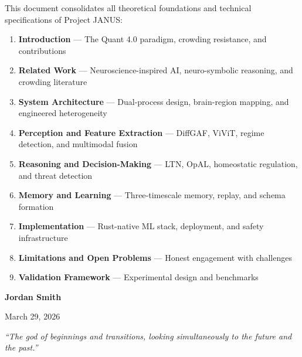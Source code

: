 \documentclass[12pt, a4paper]{article}
\makeatletter
\def\@{}%
\makeatother
\begin{document}
\begin{titlepage}
	\begin{tcolorbox}[colback=janusblue!5, colframe=janusblue, title=\textbf{Unified Documentation}, width=0.85\textwidth]
		\singlespacing\small
		This document consolidates all theoretical foundations and technical specifications of Project JANUS\@:
		\begin{enumerate}[leftmargin=1.5cm, itemsep=1pt, parsep=1pt, topsep=2pt]
			\item \textbf{\textcolor{janusblue}{Introduction}} — The Quant 4.0 paradigm, crowding resistance, and contributions
			\item \textbf{\textcolor{janusblue}{Related Work}} — Neuroscience-inspired AI, neuro-symbolic reasoning, and crowding literature
			\item \textbf{\textcolor{forwardblue}{System Architecture}} — Dual-process design, brain-region mapping, and engineered heterogeneity
			\item \textbf{\textcolor{forwardblue}{Perception and Feature Extraction}} — DiffGAF, ViViT, regime detection, and multimodal fusion
			\item \textbf{\textcolor{backwardpurple}{Reasoning and Decision-Making}} — LTN, OpAL, homeostatic regulation, and threat detection
			\item \textbf{\textcolor{backwardpurple}{Memory and Learning}} — Three-timescale memory, replay, and schema formation
			\item \textbf{\textcolor{rustorange}{Implementation}} — Rust-native ML stack, deployment, and safety infrastructure
			\item \textbf{\textcolor{warnred}{Limitations and Open Problems}} — Honest engagement with challenges
			\item \textbf{\textcolor{janusblue}{Validation Framework}} — Experimental design and benchmarks
		\end{enumerate}%
	\end{tcolorbox}

	\vfill

	{\large\bfseries Jordan Smith\par}
	\vspace{0.15cm}
	{\large March 29, 2026\par}
	\vspace{0.5cm}

	{\small\itshape ``The god of beginnings and transitions, looking simultaneously to the future and the past.''\/\par} %

\end{titlepage}
\setcounter{page}{2}
\end{document}
